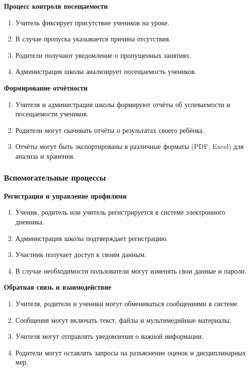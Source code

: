 \documentclass[a4paper, final]{article}
\begin{document}
\noindent \textbf{Процесс контроля посещаемости}
\begin{enumerate}
  \item Учитель фиксирует присутствие учеников на уроке.
  \item В случае пропуска указывается причина отсутствия.
  \item Родители получают уведомление о пропущенных занятиях.
  \item Администрация школы анализирует посещаемость учеников.
\end{enumerate}

\noindent \textbf{Формирование отчётности}
\begin{enumerate}
  \item Учителя и администрация школы формируют отчёты об успеваемости и посещаемости учеников.
  \item Родители могут скачивать отчёты о результатах своего ребёнка.
  \item Отчёты могут быть экспортированы в различные форматы (PDF, Excel) для анализа и хранения.
\end{enumerate}


\subsubsection{Вспомогательные процессы}
\noindent \textbf{Регистрация и управление профилями}
\begin{enumerate}
  \item Ученик, родитель или учитель регистрируется в системе электронного дневника.
  \item Администрация школы подтверждает регистрацию.
  \item Участник получает доступ к своим данным.
  \item В случае необходимости пользователи могут изменять свои данные и пароли.
\end{enumerate}

\noindent \textbf{Обратная связь и взаимодействие}
\begin{enumerate}
  \item Учителя, родители и ученики могут обмениваться сообщениями в системе.
  \item Сообщения могут включать текст, файлы и мультимедийные материалы.
  \item Учителя могут отправлять уведомления о важной информации.
  \item Родители могут оставлять запросы на разъяснение оценок и дисциплинарных мер.
\end{enumerate}
\end{document}
